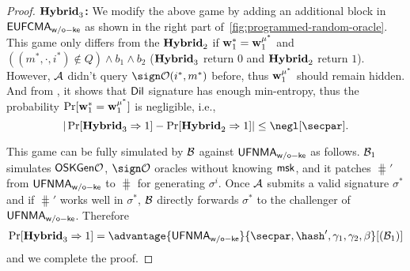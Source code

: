 \begin{proof}
\noindent\textbf{$\mathbf{Hybrid}_3$:} We modify the above game by adding an additional block in $\mathsf{EUFCMA}_\mathsf{w/o-ke}$ as shown in the right part of~\cref{fig:programmed-random-oracle}. This game only differs from the $\mathbf{Hybrid}_2$ if $\mathbf{w}_1^*= \mathbf{w}_1^{\mu^*}$ and $\left((m^*,\cdot,i^*)\notin Q\right)\wedge b_1\wedge b_2$ ($\mathbf{Hybrid}_3$ return $0$ and $\mathbf{Hybrid}_2$ return $1$). However,
$\mathcal{A}$ didn't query $\sign\Oc(i^*, m^*)$ before, thus $\mathbf{w}_1^{\mu^*}$ should remain hidden. And from \cite{EC:KilLyuSch18}, it shows that $\mathsf{Dil}$ signature has enough min-entropy, thus the probability $\Pr[\mathbf{w}_1^*= \mathbf{w}_1^{\mu^*}]$ is negligible, i.e., 
$$|\Pr[\hyb_3\Rightarrow 1] - \Pr[\hyb_2\Rightarrow 1]| \le \negl[\secpar].$$


This game can be fully simulated by $\mathcal{B}$ against $\mathsf{UFNMA}_\mathsf{w/o-ke}$ as follows. $\mathcal{B}_1$ simulates $\mathsf{OSKGen}\mathcal{O}$, $\sign\Oc$ oracles without knowing $\mathsf{msk}$, and it patches $\hash'$ from $\mathsf{UFNMA}_\mathsf{w/o-ke}$ to $\hash$ for generating $\sigma^i$. Once $\mathcal{A}$ submits a valid signature $\sigma^*$ and if $\hash'$ works well in $\sigma^*$, $\mathcal{B}$ directly forwards $\sigma^*$ to the challenger of $\mathsf{UFNMA}_\mathsf{w/o-ke}$.
Therefore $$\Pr[\hyb_3\Rightarrow 1]=\advantage{\ufnmawoke}{\secpar,\hash',\gamma_1,\gamma_2,\beta}[(\Bc_1)]$$
and we complete the proof.
\end{proof}


